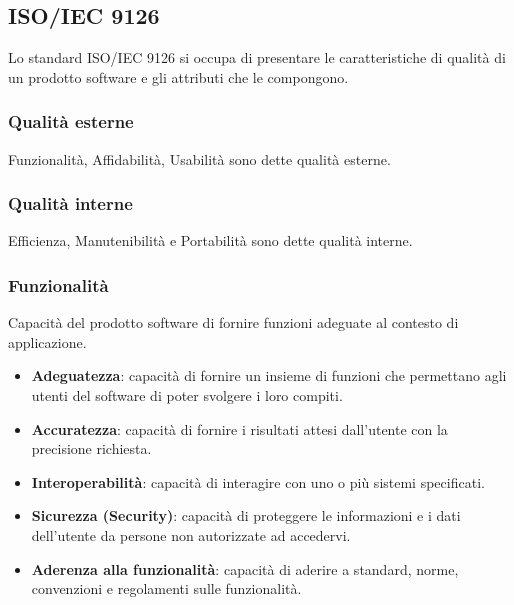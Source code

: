 \subsection{ISO/IEC 9126}
Lo standard ISO/IEC 9126 si occupa di presentare le caratteristiche di qualità di un prodotto software e gli attributi che le compongono.

\subsubsection{Qualità esterne}
Funzionalità, Affidabilità, Usabilità sono dette qualità esterne.
\subsubsection{Qualità interne}
Efficienza, Manutenibilità e Portabilità sono dette qualità interne.

\subsubsection{Funzionalità}
Capacità del prodotto software di fornire funzioni adeguate al contesto di applicazione.
\begin{itemize}
\item \textbf{Adeguatezza}: capacità di fornire un insieme di funzioni che permettano agli utenti del software di poter svolgere i loro compiti.
\item \textbf{Accuratezza}: capacità di fornire i risultati attesi dall’utente con la precisione richiesta.
\item \textbf{Interoperabilità}: capacità di interagire con uno o più sistemi specificati.
\item \textbf{Sicurezza (Security)}: capacità di proteggere le informazioni e i dati dell’utente da persone non autorizzate ad accedervi.
\item \textbf{Aderenza alla funzionalità}: capacità di aderire a standard, norme, convenzioni e regolamenti sulle funzionalità.
\end{itemize}


